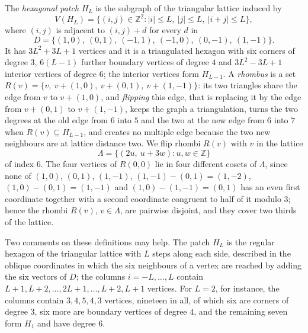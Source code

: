 \documentclass[10pt,a4paper]{article}
\begin{document}


The \emph{hexagonal patch} $H_{L}$ is the subgraph of the triangular lattice induced by
\[
V(H_{L})=\{(i,j)\in \mathbb{Z}^{2}:\left\vert i\right\vert \leq L,\ \left\vert j\right\vert \leq L,\
\left\vert i+j\right\vert \leq L\},
\]
where $(i,j)$ is adjacent to $(i,j)+d$ for every $d$ in
\[
D=\{(1,0),\ (0,1),\ (-1,1),\ (-1,0),\ (0,-1),\ (1,-1)\}.
\]
It has $3L^{2}+3L+1$ vertices and it is a triangulated hexagon with six corners of degree $3$,
$6(L-1)$ further boundary vertices of degree $4$ and $3L^{2}-3L+1$ interior vertices of degree $6$;
the interior vertices form $H_{L-1}$. A \emph{rhombus} is a set
$R(v)=\{v,\ v+(1,0),\ v+(0,1),\ v+(1,-1)\}$: its two triangles share the edge from $v$ to $v+(1,0)$,
and \emph{flipping} this edge, that is replacing it by the edge from $v+(0,1)$ to $v+(1,-1)$, keeps
the graph a triangulation, turns the two degrees at the old edge from $6$ into $5$ and the two at
the new edge from $6$ into $7$ when $R(v)\subseteq H_{L-1}$, and creates no multiple edge because the
two new neighbours are at lattice distance two. We flip rhombi $R(v)$ with $v$ in the lattice
\[
\Lambda =\{(2u,\ u+3w):u,w\in \mathbb{Z}\}
\]
of index $6$. The four vertices of $R(0,0)$ lie in four different cosets of $\Lambda $, since none of
$(1,0)$, $(0,1)$, $(1,-1)$, $(1,-1)-(0,1)=(1,-2)$, $(1,0)-(0,1)=(1,-1)$ and $(1,0)-(1,-1)=(0,1)$ has
an even first coordinate together with a second coordinate congruent to half of it modulo $3$;
hence the rhombi $R(v)$, $v\in \Lambda $, are pairwise disjoint, and they cover two thirds of the
lattice.

Two comments on these definitions may help. The patch $H_{L}$ is the regular
hexagon of the triangular lattice with $L$ steps along each side, described in
the oblique coordinates in which the six neighbours of a vertex are reached by
adding the six vectors of $D$; the columns $i=-L,\ldots ,L$ contain
$L+1,L+2,\ldots ,2L+1,\ldots ,L+2,L+1$ vertices. For $L=2$, for instance, the
columns contain $3,4,5,4,3$ vertices, nineteen in all, of which six are corners
of degree $3$, six more are boundary vertices of degree $4$, and the remaining
seven form $H_{1}$ and have degree $6$.
\end{document}
